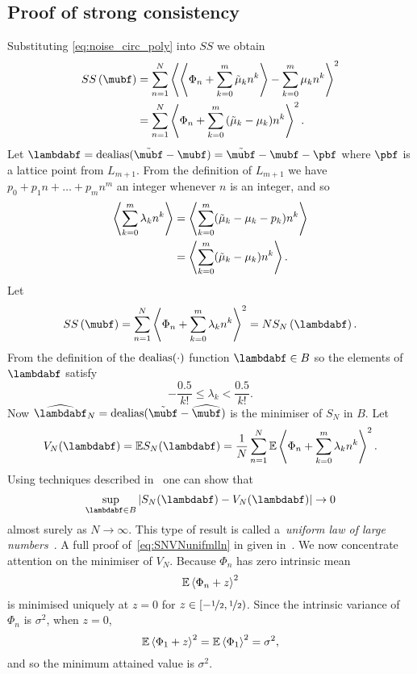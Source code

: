 \documentclass[journal]{IEEEtran}
\begin{document}
\subsection{Proof of strong consistency}\label{sec:strongconstproof}
 Substituting \eqref{eq:noise_circ_poly} into $SS$ we obtain
 \begin{align*}
SS\left( \mubf \right) &= \sum_{n=1}^{N}\fracpart{ \fracpart{ \Phi_n + \sum_{k = 0}^{m}{\tilde{\mu}_k n^k} } - \sum_{k = 0}^{m}{\mu_k n^k} }^{2} \\
&= \sum_{n=1}^{N}\fracpart{  \Phi_n + \sum_{k = 0}^{m}{(\tilde{\mu}_k - \mu_k) n^k} }^{2}.
\end{align*}
Let $\lambdabf = \dealias(\tilde{\mubf} - \mubf) = \tilde{\mubf} - \mubf - \pbf$ where $\pbf$ is a lattice point from $L_{m+1}$. From the definition of $L_{m+1}$ we have $p_0 + p_1 n + \dots + p_{m} n^m$ an integer whenever $n$ is an integer, and so
\begin{align*}
\left\langle \sum_{k=0}^{m}\lambda_k n^k  \right\rangle &= \left\langle \sum_{k=0}^{m}(\tilde{\mu}_k - \mu_k - p_k) n^k  \right\rangle \\
&= \left\langle \sum_{k=0}^{m}(\tilde{\mu}_k - \mu_k) n^k  \right\rangle.
\end{align*}
Let
\[
SS\left( \mubf \right) = \sum_{n=1}^{N}\fracpart{  \Phi_n + \sum_{k = 0}^{m}{\lambda_k n^k} }  ^{2} = N S_{N}\left( \lambdabf \right).
 \]
From the definition of the $\operatorname{dealias}(\cdot)$ function $\lambdabf \in B$ so the elements of $\lambdabf$ satisfy
 \begin{equation} \label{eq:identifiability}
 -\frac{0.5}{k!} \leq \lambda_k < \frac{0.5}{k!}.
 \end{equation} 
Now $\widehat{\lambdabf}_N = \dealias(\tilde{\mubf} - \widehat{\mubf})$ is the minimiser of $S_{N}$ in $B$.  %
Let
\[
V_N(\lambdabf) =  \expect S_N(\lambdabf) = \frac{1}{N}\sum_{n=1}^{N} \expect \fracpart{  \Phi_{n}+\sum_{k = 0}^{m}{\lambda_k n^k}}  ^{2}.
\]
Using techniques described in~\cite{Pollard_conv_stat_proc_1984,van2009empirical} one can show that
 \begin{equation}\label{eq:SNVNunifmlln}
\sup_{\lambdabf \in B}\sabs{S_N(\lambdabf) - V_N(\lambdabf)} \rightarrow 0  
 \end{equation}
almost surely as $N\rightarrow\infty$.  This type of result is called a~\emph{uniform law of large numbers}~\cite{Pollard_conv_stat_proc_1984,van2009empirical}.  A full proof of~\eqref{eq:SNVNunifmlln} in given in~\cite{McKilliam_mean_dir_est_sq_arc_length2010}.  We now concentrate attention on the minimiser of $V_N$. Because $\Phi_n$ has zero intrinsic mean 
\begin{equation}\label{eq:Efracpartmined}
{\mathbb E} \left\langle  \Phi_n + z  \right\rangle^{2}
\end{equation}
is minimised uniquely at $z = 0$ for $z \in [-\nicefrac{1}{2}, \nicefrac{1}{2})$.  Since the intrinsic variance of $\Phi_n$ is $\sigma^2$, when $z = 0$,
\begin{equation}\label{eq:Efracpartphi}
{\mathbb E}\left\langle \Phi_1+z \right\rangle^{2} = {\mathbb E}\left\langle \Phi_1 \right\rangle^{2} = \sigma^2,
\end{equation}
and so the minimum attained value is $\sigma^2$.
\end{document}

